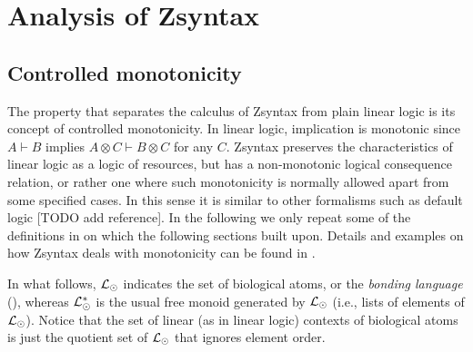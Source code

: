 \section{Analysis of Zsyntax}\label{sec:zsyntax}

\subsection{Controlled monotonicity}

The property that separates the calculus of Zsyntax from plain linear logic is
its concept of controlled monotonicity. In linear logic, implication is
monotonic since $A \vdash B$ implies $A \otimes C \vdash B \otimes C$ for any
$C$. Zsyntax preserves the characteristics of linear logic as a logic of
resources, but has a non-monotonic logical consequence relation, or rather one
where such monotonicity is normally allowed apart from some specified cases. In
this sense it is similar to other formalisms such as default logic [TODO add
reference]. In the following we only repeat some of the definitions in
\cite{adding-logic} on which the following sections built upon. Details and
examples on how Zsyntax deals with monotonicity can be found in
\cite{adding-logic}.

In what follows, $\mathcal{L}_{\odot}$ indicates the set of biological atoms, or the
\emph{bonding language} (\cite{adding-logic}), whereas
$\mathcal{L}_{\odot}^*$ is the usual free monoid generated by $\mathcal{L}_{\odot}$ (i.e.,
lists of elements of $\mathcal{L}_{\odot}$). Notice that the set of linear (as in
linear logic) contexts of biological atoms is just the quotient set of
$\mathcal{L}_{\odot}$ that ignores element order.

